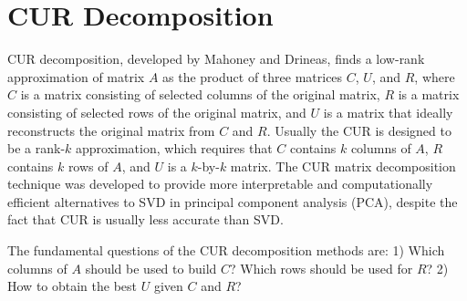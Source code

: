 \section{CUR Decomposition\label{Sec:DR:PCA}}
CUR decomposition, developed by Mahoney and Drineas\cite{MahoneyPNAS2009}, finds a low-rank approximation of matrix $A$ as the product of three matrices $C$, $U$, and $R$, where $C$ is a matrix consisting of selected columns of the original matrix, $R$ is a matrix consisting of selected rows of the original matrix, and $U$ is a matrix that ideally reconstructs the original matrix from $C$ and $R$. Usually the CUR is designed to be a rank-$k$ approximation, which requires that $C$ contains $k$ columns of $A$, $R$ contains $k$ rows of $A$, and $U$ is a $k$-by-$k$ matrix. The CUR matrix decomposition technique was developed to provide more interpretable and computationally efficient alternatives to SVD in principal component analysis (PCA), despite the fact that CUR is usually less accurate than SVD.

The fundamental questions of the CUR decomposition methods are: 1) Which columns of $A$ should be used to build $C$? Which rows should be used for $R$? 2) How to obtain the best $U$ given $C$ and $R$? %